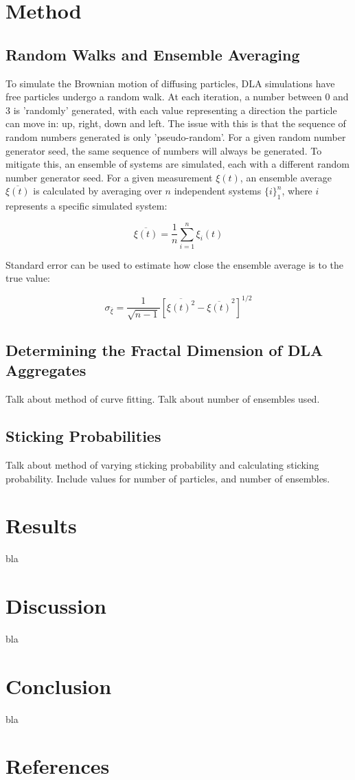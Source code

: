 \documentclass[11pt]{iopart}
\begin{document}
\section{Method}
\subsection{Random Walks and Ensemble Averaging}
To simulate the Brownian motion of diffusing particles, DLA simulations have free particles undergo a random walk. At each iteration, a number between 0 and 3 is 'randomly' generated, with each value representing a direction the particle can move in: up, right, down and left. The issue with this is that the sequence of random numbers generated is only 'pseudo-random'. For a given random number generator seed, the same sequence of numbers will always be generated. To mitigate this, an ensemble of systems are simulated, each with a different random number generator seed. For a given measurement $\xi(t)$, an ensemble average $\overline{\xi(t)}$ is calculated by averaging over $n$ independent systems $\{i\}_1^n$, where $i$ represents a specific simulated system:

\begin{equation}
\overline{\xi(t)} = \frac{1}{n}\sum_{i=1}^{n}{\xi_i(t)}
\end{equation}

Standard error can be used to estimate how close the ensemble average is to the true value:

\begin{equation}
\sigma_{\overline{\xi}} = \frac{1}{\sqrt{n-1}} \left[ \overline{\xi(t)^2} - \overline{\xi(t)}^2 \right]^{1/2}
\end{equation}

\subsection{Determining the Fractal Dimension of DLA Aggregates}

Talk about method of curve fitting. Talk about number of ensembles used. 

\subsection{Sticking Probabilities}

Talk about method of varying sticking probability and calculating sticking probability. Include values for number of particles, and number of ensembles.

\section{Results}
bla

\section{Discussion}
bla

\section{Conclusion}
bla

\section*{References}


\end{document}
